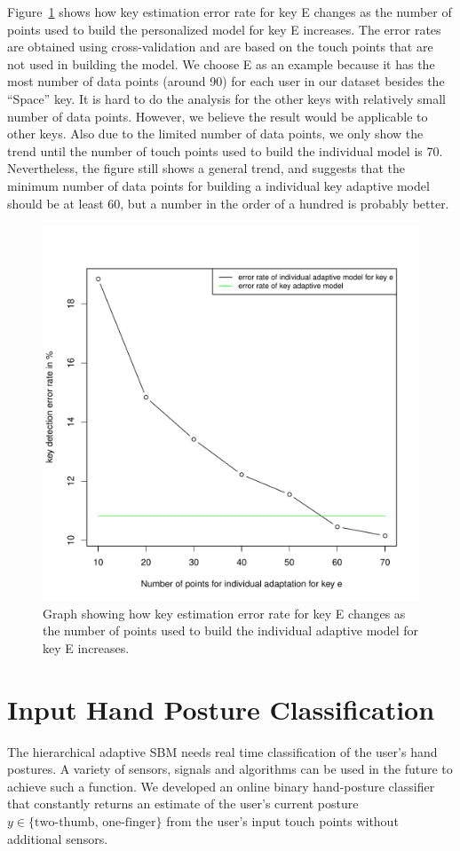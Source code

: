 \documentclass{sigchi}
\begin{document}
Figure~\ref{fig:user-adapt} shows how key estimation error rate for key E 
changes as the number of points used to build
the personalized model for key E increases. The error rates are obtained using cross-validation
and are based on the touch points that are not used in building the
model. We choose E as an
example because it has the most number of data points (around 90) for each
user in our dataset besides the ``Space'' key. It is hard to do the analysis for the other keys with
relatively small number of data points. However, we believe the result would be applicable to other
keys. Also due to the limited number
of data points, we only show the trend until the number of touch points used to build the individual
model is 70. Nevertheless, the figure still shows a general trend, and suggests 
that the minimum number of data points for building a individual key adaptive model
should be at least 60, but a number in the order of a hundred is probably better. 

\begin{figure}[tb]
  \centering
  \includegraphics[width=0.9\columnwidth]{figures/individual-adapt.pdf}
  \caption{Graph showing how key estimation error rate for key E changes as the number of
  points used to build the individual adaptive model for key E increases.}
  \label{fig:user-adapt}
\end{figure}

\section{Input Hand Posture Classification}\label{sec:posture-classification}
The hierarchical adaptive SBM needs real time classification of the user's hand postures. 
A variety of sensors, signals and algorithms can be used in the future to achieve such a
 function. We developed an online binary hand-posture classifier 
that constantly returns an estimate of the user's current posture  $y \in \{\text{two-thumb, one-finger}\}$ from the 
user's input touch points without additional sensors. 
\end{document}
